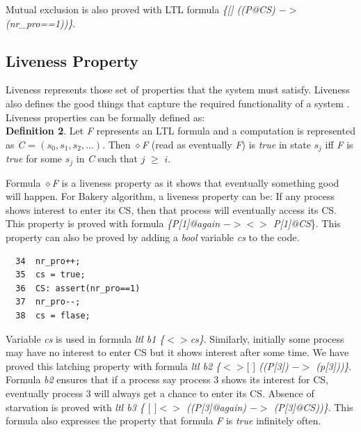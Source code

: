 \documentclass[conference]{IEEEtran}
\begin{document}
Mutual exclusion is also proved with LTL formula \emph{\{[] ((P@CS) $->$ (nr\_pro==1))\}}.

\subsection{Liveness Property}
Liveness represents those set of properties that the system must satisfy. Liveness also defines the good things that capture the 
required functionality of a system \cite{7}. Liveness properties can be formally defined as:\\
\textbf{Definition 2}. Let \emph{F} represents an LTL formula and a computation is represented as \emph{C} = $(s_0, s_1, s_2,...)$. 
Then $\diamond$\emph{F} (read as eventually \emph{F}) is \emph{true} in state $s_j$ iff \emph{F} is \emph{true} for some $s_j$ in \emph{C} such that 
$j$ $\geq$ $i$.

Formula $\diamond$\emph{F} is a liveness property as it shows that eventually something good will happen. For Bakery algorithm, a liveness property 
can be: If any process shows interest to enter its CS, then that process will eventually access its CS. This property is proved with 
formula \emph{\{P[1]@again  $-> <>$ P[1]@CS}\}. This property can also be proved by adding a \emph{bool} variable \emph{cs} to the code.
{\small \begin{verbatim}
  34  nr_pro++;
  35  cs = true;
  36  CS: assert(nr_pro==1)
  37  nr_pro--;
  38  cs = flase; 
\end{verbatim}}

Variable \emph{cs} is used in formula \emph{ltl b1 \{$<>$cs\}}. Similarly, initially some process may have no interest to enter CS but it shows 
interest after some time. We have proved this latching property with formula \emph{ltl b2 \{$<>[$ $]$ ((P[3]\@again) $->$ (p[3]\@CS))\}}. Formula 
\emph{b2} ensures that if a process say process 3 shows its interest for CS, eventually process 3 will always get a chance to enter its CS. 
Absence of starvation is proved with \emph{ltl b3 \{ $[$ $]<>$ ((P[3]@again) $->$ (P[3]@CS))\}}. This formula also expresses the property that 
formula \emph{F} is \emph{true} infinitely often. 
\end{document}
